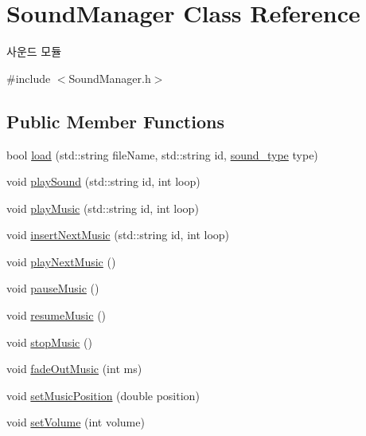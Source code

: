 \hypertarget{class_sound_manager}{}\section{Sound\+Manager Class Reference}
\label{class_sound_manager}


사운드 모듈  




{\ttfamily \#include $<$Sound\+Manager.\+h$>$}

\subsection*{Public Member Functions}
\begin{DoxyCompactItemize}
\item 
bool \mbox{\hyperlink{class_sound_manager_acf34a5ccff062eb30f4930b2426d23de}{load}} (std\+::string file\+Name, std\+::string id, \mbox{\hyperlink{group___sound_module_gadfb4b3d4c43f1e78a1e95150ca37fd1e}{sound\+\_\+type}} type)
\item 
void \mbox{\hyperlink{class_sound_manager_a44a5bc613545fc32b876f0a8c48ba542}{play\+Sound}} (std\+::string id, int loop)
\item 
void \mbox{\hyperlink{class_sound_manager_a6d17613cbba68c4ee1897aaad890d80e}{play\+Music}} (std\+::string id, int loop)
\item 
void \mbox{\hyperlink{class_sound_manager_a49e40b34437a42a68f4766a528df0198}{insert\+Next\+Music}} (std\+::string id, int loop)
\item 
void \mbox{\hyperlink{class_sound_manager_a67eb6b3c3e83c2163326e01a6816ddbc}{play\+Next\+Music}} ()
\item 
void \mbox{\hyperlink{class_sound_manager_a5071bf5e87394afdb1e4148227ffc3ea}{pause\+Music}} ()
\item 
void \mbox{\hyperlink{class_sound_manager_abd77ddeb149ae99524d536e0f6f47507}{resume\+Music}} ()
\item 
void \mbox{\hyperlink{class_sound_manager_a9aae750c8c9a1fc80abd49b5c95c95ec}{stop\+Music}} ()
\item 
void \mbox{\hyperlink{class_sound_manager_aea6a94c8b5456812c49115baa7534bf7}{fade\+Out\+Music}} (int ms)
\item 
void \mbox{\hyperlink{class_sound_manager_a0899aac2a8b7b15b639a1136fc85a1dd}{set\+Music\+Position}} (double position)
\item 
void \mbox{\hyperlink{class_sound_manager_ad46266a6f6bae4bfeeaacd687c172518}{set\+Volume}} (int volume)

\end{DoxyCompactItemize}
